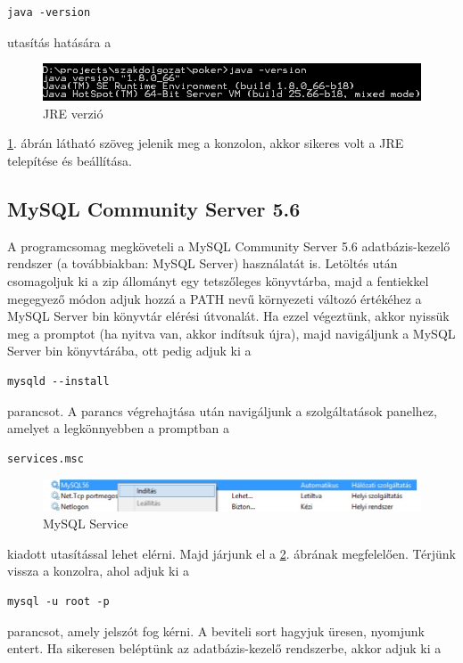 \begin{verbatim}
java -version
\end{verbatim}
utasítás hatására a
\begin{figure}[h!]
  \caption{JRE verzió}
  \label{fig:jre_version}
  \centering
    \includegraphics{user-documentation/images/java_version.jpg}
\end{figure}
 \ref{fig:jre_version}. ábrán látható szöveg jelenik meg a konzolon, akkor sikeres volt a JRE telepítése és beállítása.
 
 \subsection{MySQL Community Server 5.6}
 A programcsomag megköveteli a MySQL Community Server 5.6 adatbázis-kezelő rendszer \cite{mysqlsite} (a továbbiakban: MySQL Server) használatát is. Letöltés után csomagoljuk ki a zip állományt egy tetszőleges könyvtárba, majd a fentiekkel megegyező módon adjuk hozzá a PATH nevű környezeti változó értékéhez a MySQL Server bin könyvtár elérési útvonalát. Ha ezzel végeztünk, akkor nyissük meg a promptot (ha nyitva van, akkor indítsuk újra), majd navigáljunk a MySQL Server bin könyvtárába, ott pedig adjuk ki a
 \begin{verbatim}
mysqld --install
\end{verbatim}
parancsot. A parancs végrehajtása után navigáljunk a szolgáltatások panelhez, amelyet a legkönnyebben a promptban a
 \begin{verbatim}
services.msc
\end{verbatim}
\begin{figure}[h!]
  \caption{MySQL Service}
  \label{fig:mysql_service}
  \centering
    \includegraphics{user-documentation/images/mysql_service.jpg}
\end{figure}
kiadott utasítással lehet elérni. Majd járjunk el a \ref{fig:mysql_service}. ábrának megfelelően. Térjünk vissza a konzolra, ahol adjuk ki a 
 \begin{verbatim}
mysql -u root -p
\end{verbatim}
parancsot, amely jelszót fog kérni. A beviteli sort hagyjuk üresen, nyomjunk entert. Ha sikeresen beléptünk az adatbázis-kezelő rendszerbe, akkor adjuk ki a
